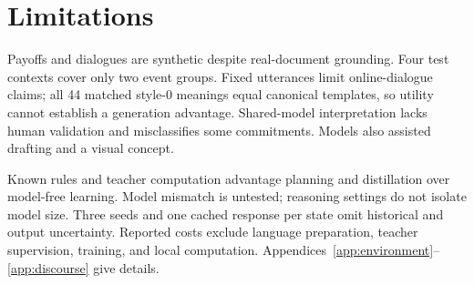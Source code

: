 \section*{Limitations}
Payoffs and dialogues are synthetic despite real-document grounding. Four test contexts cover only two event groups. Fixed utterances limit online-dialogue claims; all 44 matched style-0 meanings equal canonical templates, so utility cannot establish a generation advantage. Shared-model interpretation lacks human validation and misclassifies some commitments. Models also assisted drafting and a visual concept.

Known rules and teacher computation advantage planning and distillation over model-free learning. Model mismatch is untested; reasoning settings do not isolate model size. Three seeds and one cached response per state omit historical and output uncertainty. Reported costs exclude language preparation, teacher supervision, training, and local computation. Appendices~\ref{app:environment}--\ref{app:discourse} give details.
